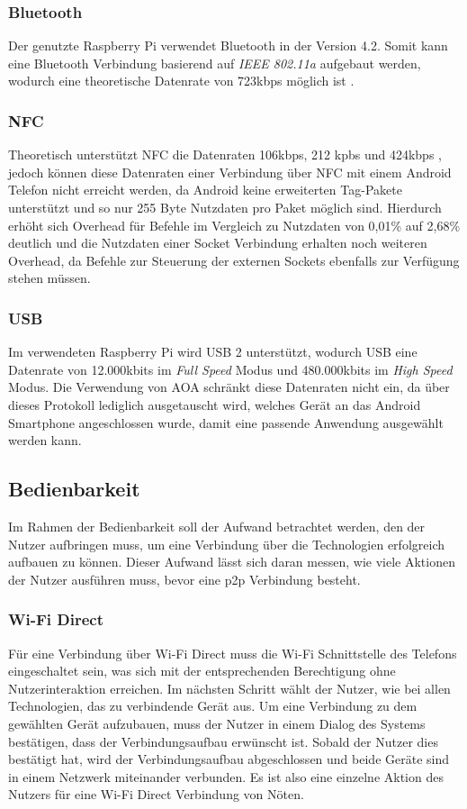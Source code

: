 		\subsubsection{Bluetooth} Der genutzte Raspberry Pi verwendet Bluetooth in der Version 4.2. Somit kann eine Bluetooth Verbindung basierend auf {\it IEEE 802.11a} aufgebaut werden, wodurch eine theoretische Datenrate von 723kbps möglich ist \cite[S.377]{Sauter}.
		
		\subsubsection{NFC} Theoretisch unterstützt NFC die Datenraten 106kbps, 212 kpbs und 424kbps \linebreak \cite{nfcRates}, jedoch können diese Datenraten einer Verbindung über NFC mit einem Android Telefon nicht erreicht werden, da Android keine erweiterten Tag-Pakete unterstützt \cite{nfcBug} und so nur 255 Byte Nutzdaten pro Paket möglich sind. Hierdurch erhöht sich Overhead für Befehle im Vergleich zu Nutzdaten von 0,01\% auf 2,68\% deutlich und die Nutzdaten einer Socket Verbindung erhalten noch weiteren Overhead, da Befehle zur Steuerung der externen Sockets ebenfalls zur Verfügung stehen müssen.
		
		\subsubsection{USB} Im verwendeten Raspberry Pi wird USB 2 unterstützt, wodurch USB eine Datenrate von 12.000kbits im {\it Full Speed} Modus und 480.000kbits im {\it High Speed} Modus. Die Verwendung von AOA schränkt diese Datenraten nicht ein, da über dieses Protokoll lediglich ausgetauscht wird, welches Gerät an das Android Smartphone angeschlossen wurde, damit eine passende Anwendung ausgewählt werden kann.
		
		\subsection{Bedienbarkeit}
      Im Rahmen der Bedienbarkeit soll der Aufwand betrachtet werden, den der Nutzer aufbringen muss, um eine Verbindung über die Technologien erfolgreich aufbauen zu können. Dieser Aufwand lässt sich daran messen, wie viele Aktionen der Nutzer ausführen muss, bevor eine p2p Verbindung besteht.
      
		\subsubsection{Wi-Fi Direct} Für eine Verbindung über Wi-Fi Direct muss die Wi-Fi Schnittstelle des Telefons eingeschaltet sein, was sich mit der entsprechenden Berechtigung ohne Nutzerinteraktion erreichen. Im nächsten Schritt wählt der Nutzer, wie bei allen Technologien, das zu verbindende Gerät aus. Um eine Verbindung zu dem gewählten Gerät aufzubauen, muss der Nutzer in einem Dialog des Systems bestätigen, dass der Verbindungsaufbau erwünscht ist. Sobald der Nutzer dies bestätigt hat, wird der Verbindungsaufbau abgeschlossen und beide Geräte sind in einem Netzwerk miteinander verbunden. Es ist also eine einzelne Aktion des Nutzers für eine Wi-Fi Direct Verbindung von Nöten.
		
